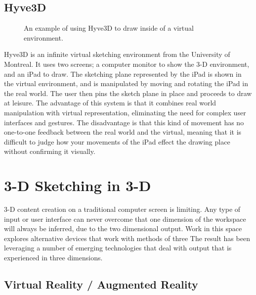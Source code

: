 \subsection{Hyve3D}

\begin{figure}
\centering  
{}
\caption{An example of using Hyve3D to draw inside of a virtual environment. \autocite{hyve3d}}

\end{figure}

Hyve3D\autocite{hyve3d} is an infinite virtual sketching environment from the University of Montreal. It uses two screens; a computer monitor to show the 3-D environment, and an iPad to draw. The sketching plane represented by the iPad is shown in the virtual environment, and is manipulated by moving and rotating the iPad in the real world. The user then pins the sketch plane in place and proceeds to draw at leisure. The advantage of this system is that it combines real world manipulation with virtual representation, eliminating the need for complex user interfaces and gestures. The disadvantage is that this kind of movement has no one-to-one feedback between the real world and the virtual, meaning that it is difficult to judge how your movements of the iPad effect the drawing place without confirming it visually.



\section{3-D Sketching in 3-D}

3-D content creation on a traditional computer screen is limiting. 
Any type of input or user interface can never overcome that one dimension of the workspace will always be inferred, due to the two dimensional output.
Work in this space explores alternative devices that work with methods of three
The result has been leveraging a number of emerging technologies that deal with output that is experienced in three dimensions. 


\subsection{Virtual Reality / Augmented Reality}

